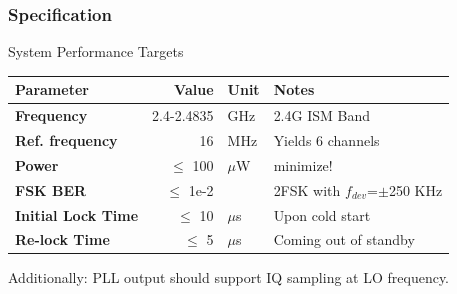 \documentclass[t, screen, aspectratio=43]{beamer}
\begin{document}
\begin{frame}
	\frametitle{Specification\color{black}}
	\begin{block}{System Performance Targets}
		\scriptsize
		\begin{table}[h!]
			\centering
			\def\arraystretch{1.5}		
			\setlength\arrayrulewidth{0.75pt}
			\setlength{\tabcolsep}{1em} %
			\begin{tabular}{|l|r|l|l|}
				\hline 
				\rule[-1ex]{0pt}{2.5ex} \cellcolor{gray!40}\textbf{Parameter} & \cellcolor{gray!40}\textbf{Value} & \cellcolor{gray!40}\textbf{Unit }& \cellcolor{gray!40}\textbf{Notes}\\ 
				\hline 
				\rule[-1ex]{0pt}{2.5ex} \textbf{Frequency}  & 2.4-2.4835 & GHz & 2.4G ISM Band\\ 
				\hline 
				\rule[-1ex]{0pt}{2.5ex} \textbf{Ref. frequency} & 16 & MHz & Yields 6 channels \\ 
				\hline 
				\rule[-1ex]{0pt}{2.5ex} \textbf{Power} & $\leq$ 100  &$\mu$W & minimize!\\ 
				\hline 
				\rule[-1ex]{0pt}{2.5ex} \textbf{FSK BER} & $\leq$ 1e-2  & & 2FSK with $f_{dev}$=$\pm$250 KHz\\ 
				\hline 
				\rule[-1ex]{0pt}{2.5ex} \textbf{Initial Lock Time} & $\leq$ 10 & $\mu$s & Upon cold start \\ 
				\hline 
				\rule[-1ex]{0pt}{2.5ex} \textbf{Re-lock Time} & $\leq$ 5 & $\mu$s & Coming out of standby \\ 
				\hline 
			\end{tabular} 
		\end{table}   
		Additionally: PLL output should support IQ sampling at LO frequency.
	\end{block}    
\end{frame}






\end{document}
